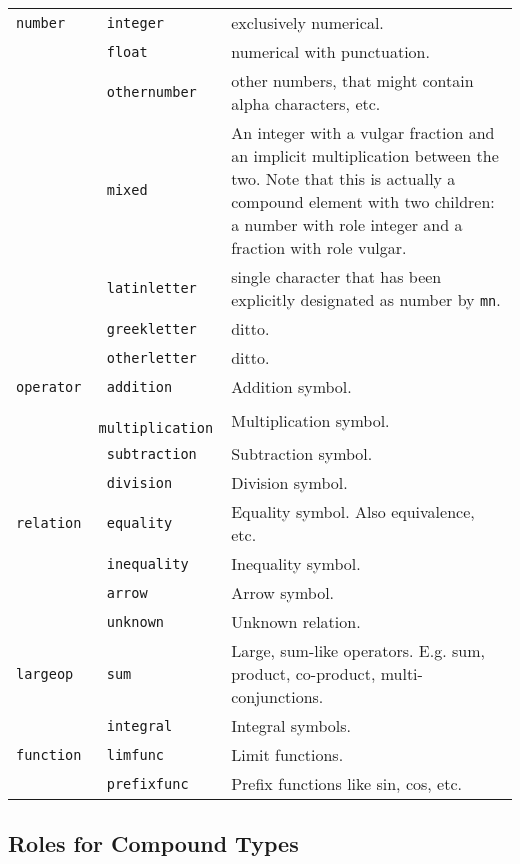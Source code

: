 \documentclass{article}
\def\mathml#1{\texttt{#1}}
\begin{document}
\begin{tabular}{>{\tt}l>{\tt}lp{11cm}}
  number & integer & exclusively numerical.\\
              & float & numerical with punctuation.\\
              & othernumber & other numbers, that might contain alpha characters, etc.\\
              & mixed & An integer with a vulgar fraction and an implicit multiplication between the two.
                        Note that this is actually a compound element with two children: a number 
                        with role integer and a fraction with role vulgar.\\
              & latinletter & single character that has been explicitly designated as number by \mathml{mn}.\\
              & greekletter & ditto.\\
              & otherletter & ditto. \\
  operator    & addition & Addition symbol.\\
              & multiplication & Multiplication symbol.\\
              & subtraction & Subtraction symbol.\\
              & division & Division symbol.\\
  relation    & equality & Equality symbol. Also equivalence, etc.\\
              & inequality & Inequality symbol.\\
              & arrow & Arrow symbol.\\
              & unknown & Unknown relation.\\
  largeop & sum & Large, sum-like operators. E.g. sum, product, co-product, multi-conjunctions.\\
              & integral & Integral symbols.\\
  function & limfunc & Limit functions.\\
              & prefixfunc & Prefix functions like sin, cos, etc.\\
\end{tabular}


\subsection{Roles for Compound Types}
\end{document}

